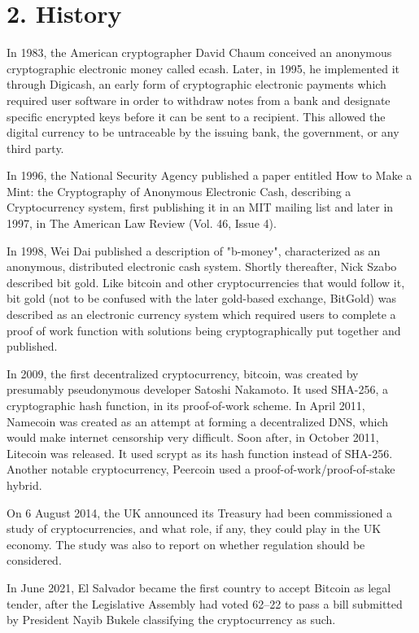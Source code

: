 \section*{2. History}

In 1983, the American cryptographer David Chaum conceived an anonymous cryptographic electronic money called ecash. Later, in 1995, he implemented it through Digicash, an early form of cryptographic electronic payments which required user software in order to withdraw notes from a bank and designate specific encrypted keys before it can be sent to a recipient. This allowed the digital currency to be untraceable by the issuing bank, the government, or any third party.\vspace{.3cm}

In 1996, the National Security Agency published a paper entitled How to Make a Mint: the Cryptography of Anonymous Electronic Cash, describing a Cryptocurrency system, first publishing it in an MIT mailing list and later in 1997, in The American Law Review (Vol. 46, Issue 4).\vspace{.3cm}

In 1998, Wei Dai published a description of "b-money", characterized as an anonymous, distributed electronic cash system. Shortly thereafter, Nick Szabo described bit gold. Like bitcoin and other cryptocurrencies that would follow it, bit gold (not to be confused with the later gold-based exchange, BitGold) was described as an electronic currency system which required users to complete a proof of work function with solutions being cryptographically put together and published.\vspace{.3cm}

In 2009, the first decentralized cryptocurrency, bitcoin, was created by presumably pseudonymous developer Satoshi Nakamoto. It used SHA-256, a cryptographic hash function, in its proof-of-work scheme. In April 2011, Namecoin was created as an attempt at forming a decentralized DNS, which would make internet censorship very difficult. Soon after, in October 2011, Litecoin was released. It used scrypt as its hash function instead of SHA-256. Another notable cryptocurrency, Peercoin used a proof-of-work/proof-of-stake hybrid.\vspace{.3cm}

On 6 August 2014, the UK announced its Treasury had been commissioned a study of cryptocurrencies, and what role, if any, they could play in the UK economy. The study was also to report on whether regulation should be considered.\vspace{.3cm}

In June 2021, El Salvador became the first country to accept Bitcoin as legal tender, after the Legislative Assembly had voted 62–22 to pass a bill submitted by President Nayib Bukele classifying the cryptocurrency as such.\vspace{.3cm}